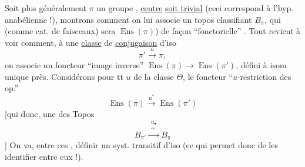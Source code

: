 Soit plus généralement \(\pi\) un groupe ,  
\uline{centre} \uline{soit trivial} (ceci correspond à l'hyp.
anabélienne !), montrons comment on
lui associe un topos classifiant
\(B_\pi\), qui (comme cat. de faisceaux) sera
\(\operatorname{Ens}(\pi)\)) de façon ``fonctorielle'' . Tout
revient à voir comment, à une \uline{classe}
de \uline{conjugaison} \inserted{\(\Theta\)} d'iso
\[
\pi'\xrightarrow{u}\pi,
\]
on associe un foncteur ``image inverse''
\(\operatorname{Ens}(\pi)\longrightarrow\operatorname{Ens}(\pi')\), défini à isom unique
près. Considérons pour tt \(u\) de la classe
\(\Theta\), le foncteur ``\(u\)-restriction des op.''
\[
\operatorname{Ens}(\pi)\xrightarrow{u^*}\operatorname{Ens}(\pi')
\]
[qui  donc, 
une  des Topos
\[
B_{\pi'}\xrightarrow{\substack{u_\bullet\\ \sim}} B_\pi
\]
]
On va, entre ces ,  définir un
syst. transitif d'iso (ce qui permet
donc de les identifier entre eux !).

